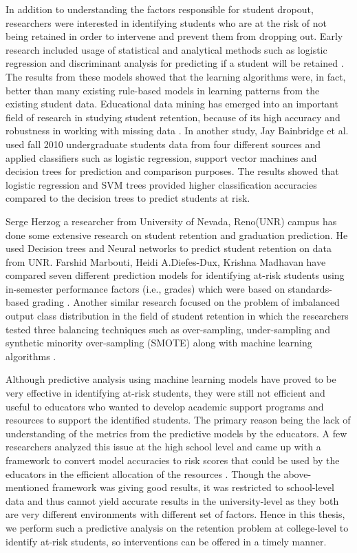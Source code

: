 \documentclass[11pt,openright]{report}
\begin{document}
In addition to understanding the factors responsible for student dropout, researchers were interested in identifying students who are at the risk of not being retained in order to intervene and prevent them from dropping out. Early research included usage of statistical and analytical methods such as logistic regression and discriminant analysis for predicting if a student will be retained \cite{lakkaraju2015machine,marbouti2016models,adejo2017}. The results from these models showed that the learning algorithms were, in fact, better than many existing rule-based models in learning patterns from the existing student data. Educational data mining has emerged into an important field of research in studying student retention, because of its high accuracy and robustness in working with missing data \cite{alkhasawneh2014developing}. In another study, Jay Bainbridge et al. used fall 2010 undergraduate students data from four different sources and applied classifiers such as logistic regression, support vector machines and decision trees for prediction and comparison purposes\cite{bainbridge2015}. The results showed that logistic regression and SVM trees provided higher classification accuracies compared to the decision trees to predict students at risk. 

Serge Herzog a researcher from University of Nevada, Reno(UNR) campus has done some extensive research on student retention and graduation prediction. He used Decision trees and Neural networks to predict student retention on data from UNR\cite{herzog2006estimating}. Farshid Marbouti, Heidi A.Diefes-Dux, Krishna Madhavan have compared seven different prediction models for identifying at-risk students using in-semester performance factors (i.e., grades) which were based on standards-based grading \cite{marbouti2016models} . Another similar research focused on the problem of imbalanced output class distribution in the field of student retention in which the researchers tested three balancing techniques such as over-sampling, under-sampling and synthetic minority over-sampling (SMOTE) along with machine learning algorithms \cite{thammasiri2014critical}.

Although predictive analysis using machine learning models have proved to be very effective in identifying at-risk students, they were still not efficient and useful to educators who wanted to develop academic support programs and resources to support the identified students. The primary reason being the lack of understanding of the metrics from the predictive models by the educators. A few researchers analyzed this issue at the high school level and came up with a framework to convert model accuracies to risk scores that could be used by the educators in the efficient allocation of the resources \cite{lakkaraju2015machine}. Though the above-mentioned framework was giving good results, it was restricted to school-level data and thus cannot yield accurate results in the university-level as they both are very different environments with different set of factors. Hence in this thesis, we perform such a predictive analysis on the retention problem at college-level  to identify at-risk students, so interventions can be offered in a timely manner.
\end{document}
